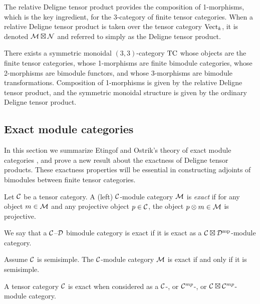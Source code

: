 \documentclass{amsart}
\begin{document}
The relative Deligne tensor product provides the composition of 1-morphisms, which is the key ingredient, for the 3-category of finite tensor categories.  When a relative Deligne tensor product is taken over the tensor category $\mathrm{Vect}_k$, it is denoted $\mathcal M \boxtimes \mathcal N$ and referred to simply as the Deligne tensor product.

\begin{theorem}[\cite{3TC}]
	There exists a symmetric monoidal $(3,3)$-category $\mathrm{TC}$ whose objects are the finite tensor categories, whose 1-morphisms are finite bimodule categories, whose 2-morphisms are bimodule functors, and whose 3-morphisms are bimodule transformations. Composition of 1-morphisms is given by the relative Deligne tensor product, and the symmetric monoidal structure is given by the ordinary Deligne tensor product. 
\end{theorem}

\subsection{Exact module categories} \label{sec:tc-exact}
In this section we summarize Etingof and Ostrik's theory of exact module categories \cite{EO-ftc}, and prove a new result about the exactness of Deligne tensor products.  These exactness properties will be essential in constructing adjoints of bimodules between finite tensor categories.

\begin{definition}
	Let $\mathcal C$ be a tensor category. A (left) $\mathcal C$-module category $\mathcal M$ is {\em exact} if for any object $m \in \mathcal M$ and  any projective object $p \in \mathcal C$, the object $p \otimes m \in \mathcal M$ is projective. 
\end{definition}

\begin{definition}
We say that a $\mathcal C$--$\mathcal D$ bimodule category is exact if it is exact as a $\mathcal C \boxtimes \mathcal D^{\mathrm{mp}}$-module category.
\end{definition}


\begin{example}
	Assume $\mathcal C$ is semisimple.  The $\mathcal C$-module category $\mathcal M$ is exact if and only if it is semisimple.
\end{example} %

\begin{example} \label{ex:exactness}
	A tensor category $\mathcal C$ is exact when considered as a $\mathcal C$-, or $\mathcal C^{mp}$-, or $\mathcal C \boxtimes \mathcal C^{mp}$-module category. 
\end{example} %
\end{document}
